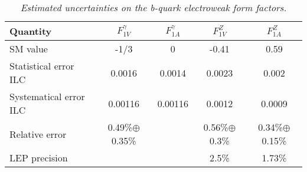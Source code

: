 \begin{table}
        \begin{center}
        \begin{tabular}{l c c c c}
        \hline
	Quantity  				 & $F_{1V}^\gamma$ & $F_{1A}^\gamma$ &  $F_{1V}^Z$ &  $F_{1A}^Z$\\
	\hline
	SM value  				 & -1/3   			    & 0				  & -0.41		& 0.59\\
	Statistical error ILC    & 0.0016   			& 0.0014		  & 0.0023 		& 0.002\\
	Systematical error ILC   & 0.00116  			& 0.00116		  & 0.0012 		& 0.0009\\
	Relative error			 & 0.49\%$\oplus$0.35\%	& 				  & 0.56\%$\oplus$0.3\%		& 0.34\%$\oplus$0.15\%\\
	LEP precision 			 & 						&				  & 2.5\% 		& 1.73\% \\
        \hline
        \end{tabular}
        \end{center}
        \caption{\sl Estimated uncertainties on the b-quark electroweak form factors.}
        \label{table:fffinal}
\end{table}
